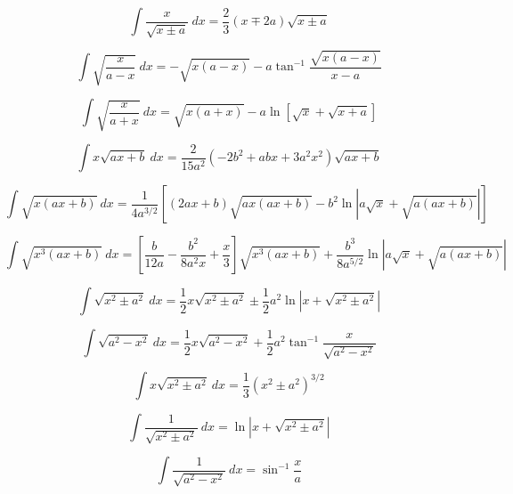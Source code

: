 \documentclass[12pt,letterpaper,leqno]{article}
\begin{document}
\begin{equation}\label{eq:Weems}
\int \frac{x}{\sqrt{x\pm a} } \ dx = \frac{2}{3}(x\mp 2a)\sqrt{x\pm a}
\end{equation}

\begin{equation}
\int \sqrt{\frac{x}{a-x}}\ dx =  -\sqrt{x(a-x)}
-a\tan^{-1}\frac{\sqrt{x(a-x)}}{x-a}
\end{equation}

\begin{equation}
\int \sqrt{\frac{x}{a+x}}\ dx =  \sqrt{x(a+x)} 
-a\ln \left [ \sqrt{x} + \sqrt{x+a}\right] 
\end{equation}

\begin{equation}
\int x \sqrt{ax + b}\ dx =
\frac{2}{15 a^2}(-2b^2+abx + 3 a^2 x^2)
\sqrt{ax+b}
\end{equation}

\begin{equation}
\int \sqrt{x(ax+b)}\ dx = \frac{1}{4a^{3/2}}\left[(2ax + b)\sqrt{ax(ax+b)} 
-b^2 \ln \left| a\sqrt{x} + \sqrt{a(ax+b)} \right| \right ] 
\end{equation}

\begin{equation}
\int \sqrt{x^3(ax+b)} \ dx =\left [ 
\frac{b}{12a}-
\frac{b^2}{8a^2x}+
\frac{x}{3}\right] 
\sqrt{x^3(ax+b)}  + 
\frac{b^3}{8a^{5/2}}\ln \left | a\sqrt{x} + \sqrt{a(ax+b)} \right |
\end{equation}

\begin{equation}
\int\sqrt{x^2 \pm a^2}\ dx = \frac{1}{2}x\sqrt{x^2\pm a^2} 
\pm\frac{1}{2}a^2 \ln \left | x + \sqrt{x^2\pm a^2} \right | 
\end{equation}

\begin{equation}
\int  \sqrt{a^2 - x^2}\ dx = \frac{1}{2} x \sqrt{a^2-x^2} 
+\frac{1}{2}a^2\tan^{-1}\frac{x}{\sqrt{a^2-x^2}}
\end{equation}

\begin{equation}
\int  x \sqrt{x^2 \pm a^2}\ dx= \frac{1}{3}\left ( x^2 \pm a^2 \right)^{3/2} 
\end{equation}

\begin{equation}
\int \frac{1}{\sqrt{x^2 \pm a^2}}\ dx = \ln \left | x + \sqrt{x^2 \pm a^2} \right | 
\end{equation}

\begin{equation}
\int \frac{1}{\sqrt{a^2 - x^2}}\ dx = \sin^{-1}\frac{x}{a} 
\end{equation}
\end{document}
